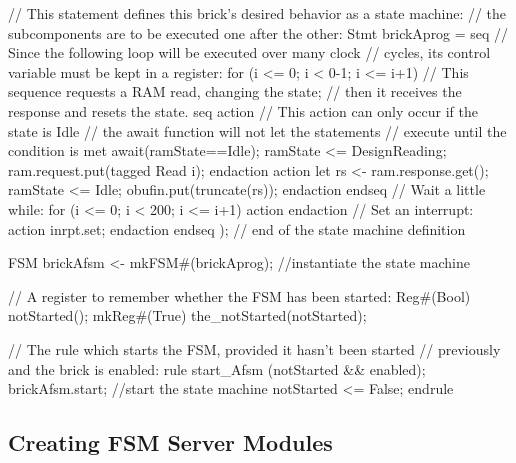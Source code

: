 \begin{libverbatim}

   // This statement defines this brick's desired behavior as a state machine:
   // the subcomponents are to be executed one after the other:   
   Stmt brickAprog =
     seq
        // Since the following loop will be executed over many clock
        // cycles, its control variable must be kept in a register:
        for (i <= 0; i < 0-1; i <= i+1)
           // This sequence requests a RAM read, changing the state;
           // then it receives the response and resets the state.
           seq
              action
                 // This action can only occur if the state is Idle
                 // the await function will not let the statements
                 // execute until the condition is met
                 await(ramState==Idle);         
                 ramState <= DesignReading;
                 ram.request.put(tagged Read i);
              endaction
              action
                 let rs <- ram.response.get();
                 ramState <= Idle;
                 obufin.put(truncate(rs));
              endaction
           endseq
        // Wait a little while:
        for (i <= 0; i < 200; i <= i+1)
           action
           endaction
        // Set an interrupt:
        action
           inrpt.set;
        endaction
     endseq
     );
   // end of the state machine definition

   FSM brickAfsm  <-  mkFSM#(brickAprog);  //instantiate the state machine

   // A register to remember whether the FSM has been started:
   Reg#(Bool) notStarted();
   mkReg#(True) the_notStarted(notStarted);
   
   // The rule which starts the FSM, provided it hasn't been started
   // previously and the brick is enabled:
   rule start_Afsm (notStarted && enabled);
      brickAfsm.start;                //start the state machine
      notStarted <= False;
   endrule
\end{libverbatim}



\subsection{Creating FSM Server Modules}

\label{sec-stmtFSMservers}

